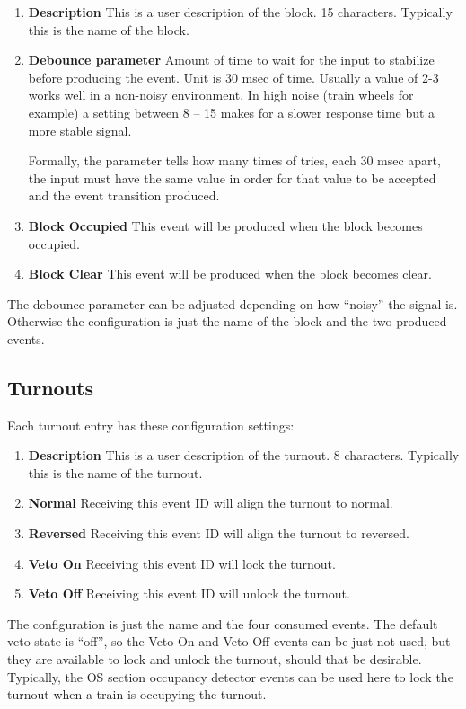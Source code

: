 \begin{enumerate}
\item \textbf{Description} This is a user description of the block. 15 
characters.  Typically this is the name of the block.
\item \textbf{Debounce parameter} Amount of time to wait for the input to 
stabilize before producing the event. Unit is 30 msec of time. Usually a value 
of 2-3 works well in a non-noisy environment. In high noise (train wheels for 
example) a setting between 8 -- 15 makes for a slower response time but a more 
stable signal.

Formally, the parameter tells how many times of tries, each 30 msec apart, the 
input must have the same value in order for that value to be accepted and the 
event transition produced.
\item \textbf{Block Occupied} This event will be produced when the block 
becomes occupied.
\item \textbf{Block Clear} This event will be produced when the block becomes 
clear.
\end{enumerate}

The debounce parameter can be adjusted depending on how ``noisy'' the signal 
is.  Otherwise the configuration is just the name of the block and the two 
produced events.

\subsection{Turnouts}

Each turnout entry has these configuration settings:

\begin{enumerate}
\item \textbf{Description} This is a user description of the turnout. 8 
characters.  Typically this is the name of the turnout.
\item \textbf{Normal} Receiving this event ID will align the turnout to 
normal.
\item \textbf{Reversed} Receiving this event ID will align the turnout to 
reversed.
\item \textbf{Veto On} Receiving this event ID will lock the turnout.
\item \textbf{Veto Off} Receiving this event ID will unlock the turnout.
\end{enumerate}

The configuration is just the name and the four consumed events. The default
veto state is ``off'', so the Veto On and Veto Off events can be just not
used, but they are available to lock and unlock the turnout, should that be
desirable.  Typically, the OS section occupancy detector events can be used 
here to lock the turnout when a train is occupying the turnout.

